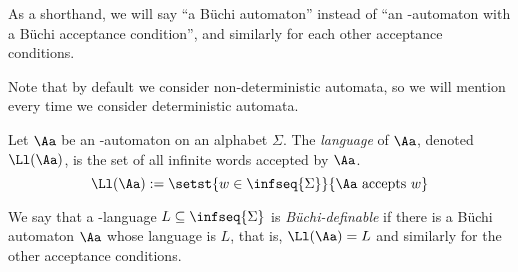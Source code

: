 \begin{remark}
    As a shorthand, we will say ``a Büchi automaton''
    instead of ``an \w-automaton with a Büchi acceptance condition'',
    and similarly for each other acceptance conditions.

    Note that by default we consider non-deterministic automata,
    so we will mention every time we consider deterministic
    automata.
\end{remark}

\begin{definition}
    Let $\Aa$ be an \w-automaton on an alphabet $\Sigma$.
    The \emph{language} of $\Aa$, denoted $\Ll(\Aa)$,
    is the set of all infinite words accepted by $\Aa$.
    \[
        \Ll(\Aa) := \setst{w \in \infseq{\Sigma}}{\Aa \text{ accepts } w}
    \]

    We say that a \w-language $L \subseteq \infseq{\Sigma}$ is
    \emph{Büchi-definable} if there is a Büchi automaton $\Aa$
    whose language is $L$,  that is, $\Ll(\Aa) = L$
    and similarly for the other acceptance conditions.
\end{definition}


